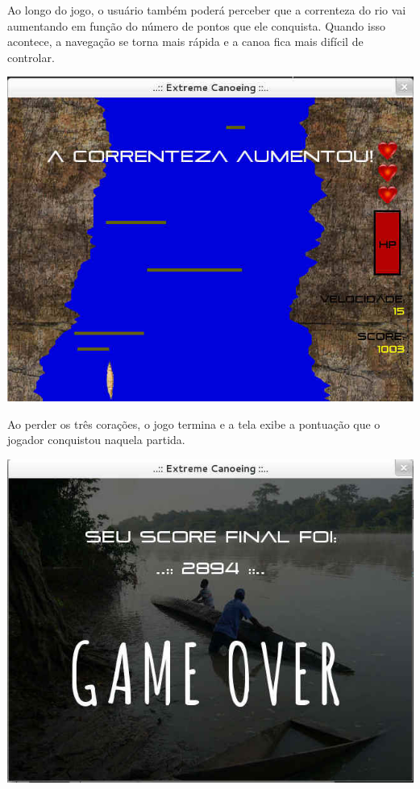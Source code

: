 \documentclass[11pt,a4paper]{article}
\begin{document}
Ao longo do jogo, o usuário também poderá perceber que a correnteza do rio vai aumentando em função do número de pontos que ele conquista. Quando isso acontece, a navegação se torna mais rápida e a canoa fica mais difícil de controlar.

\begin{center}
\includegraphics[scale=0.5]{correnteza.jpg}
\end{center}

Ao perder os três corações, o jogo termina e a tela exibe a pontuação que o jogador conquistou naquela partida.

\begin{center}
\includegraphics[scale=0.5]{gameover.jpg}
\end{center}
\end{document}
